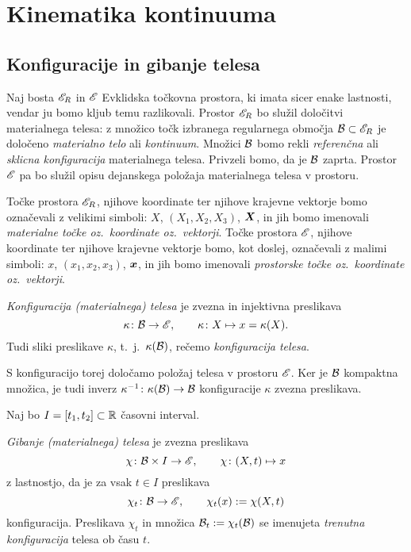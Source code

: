 \chapter{Kinematika kontinuuma} \label{chp:kinkon}


\section{Konfiguracije in gibanje telesa}


Naj bosta $\mathscr E_R$ in $\mathscr E$ Evklidska točkovna prostora, ki imata sicer enake lastnosti,
vendar ju bomo kljub temu razlikovali. Prostor $\mathscr E_R$ bo služil določitvi materialnega
telesa: z množico točk izbranega regularnega območja $\mathcal B\subset\mathscr E_R$ je določeno \emph{materialno
telo} ali \emph{kontinuum}. Množici $\mathcal B$ bomo rekli \emph{referenčna} ali \emph{sklicna konfiguracija}
materialnega telesa. Privzeli bomo, da je $\mathcal B$ zaprta.
Prostor $\mathscr E$ pa bo služil opisu dejanskega položaja materialnega telesa v prostoru.

Točke prostora $\mathscr E_R$, njihove koordinate ter njihove krajevne vektorje bomo označevali
z velikimi simboli: $X$, $(X_1,X_2,X_3)$, $\boldsymbol X$, in jih bomo imenovali
\emph{materialne točke oz.~koordinate oz.~vektorji}.
Točke prostora $\mathscr E$, njihove koordinate ter njihove krajevne vektorje bomo,
kot doslej, označevali z malimi simboli: $x$, $(x_1,x_2,x_3)$, $\boldsymbol x$, in jih bomo imenovali
\emph{prostorske točke oz.~koordinate oz.~vektorji}.

\begin{definicija}
	\emph{Konfiguracija (materialnega) telesa} je zvezna in injektivna preslikava
	\[ \kappa\colon \mathcal B\to\mathscr E,\qquad \kappa\colon X\mapsto x=\kappa(X). \]
	Tudi sliki preslikave $\kappa$, t.~j.~$\kappa(\mathcal B)$, rečemo \emph{konfiguracija telesa}.
\end{definicija}
S konfiguracijo torej določamo položaj telesa v prostoru $\mathscr E$. Ker je $\mathcal B$ kompaktna
množica, je tudi inverz $\kappa^{-1}\colon\kappa(\mathcal B)\to\mathcal B$ konfiguracije $\kappa$ zvezna preslikava.

Naj bo $I=[t_1,t_2]\subset\mathbb R$ časovni interval.
\begin{definicija}
	\emph{Gibanje (materialnega) telesa} je zvezna preslikava
	\begin{equation}\label{e:chi}
		\chi\colon\mathcal B\times I\to\mathscr E,\qquad \chi\colon(X,t)\mapsto x
	\end{equation}
	z lastnostjo, da je za vsak $t\in I$ preslikava
	\[ \chi_t\colon\mathcal B\to\mathscr E,\qquad \chi_t(x):=\chi(X,t) \]
	konfiguracija. Preslikava $\chi_t$ in množica $\mathcal B_t:=\chi_t(\mathcal B)$ se imenujeta
	\emph{trenutna konfiguracija} telesa ob času $t$.
\end{definicija}

